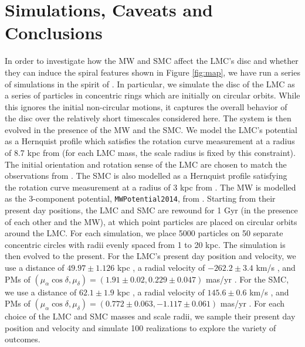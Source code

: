 \documentclass[a4paper,useAMS,usenatbib]{mnras}
\begin{document}
\section{Simulations, Caveats and Conclusions}

In order to investigate how the MW and SMC affect the LMC's disc and
whether they can induce the spiral features shown in Figure
\ref{fig:map}, we have run a series of simulations in the spirit of
\cite{Toomre1972}. In particular, we simulate the disc of the LMC as a
series of particles in concentric rings which are initially on
circular orbits. While this ignores the initial non-circular motions,
it captures the overall behavior of the disc over the relatively short
timescales considered here. The system is then evolved in the presence
of the MW and the SMC. We model the LMC's potential as a Hernquist
profile \citep{hernquist_profile} which satisfies the rotation curve
measurement at a radius of 8.7 kpc from \cite{vandermarel_lmc} (for
each LMC mass, the scale radius is fixed by this constraint). The
initial orientation and rotation sense of the LMC are chosen to match
the observations from \cite{vandermarel_lmc}. The SMC is also modelled
as a Hernquist profile satisfying the rotation curve measurement at a
radius of 3 kpc from \cite{staminirovic_smc_mass}. The MW is modelled
as the 3-component potential, \texttt{MWPotential2014}, from
\cite{galpy}. Starting from their present day positions, the LMC and
SMC are rewound for 1 Gyr (in the presence of each other and the MW),
at which point particles are placed on circular orbits around the
LMC. For each simulation, we place 5000 particles on 50 separate
concentric circles with radii evenly spaced from 1 to 20 kpc. The
simulation is then evolved to the present. For the LMC's present day
position and velocity, we use a distance of $49.97 \pm 1.126$ kpc
\citep{pietrzynski_lmc_dist}, a radial velocity of $-262.2\pm3.4$ km/s
\citep{vandermarel_lmc_rv}, and PMs of $(\mu_\alpha \cos \delta,
\mu_\delta) = (1.91\pm 0.02,0.229\pm0.047)$ mas/yr
\citep{kallivayalil_lmc_pm}. For the SMC, we use a distance of
$62.1\pm1.9$ kpc \citep{graczyk_smc_distance}, a radial velocity of
$145.6\pm0.6$ km/s \citep{harris_smc_vel}, and PMs of
$(\mu_\alpha \cos \delta, \mu_\delta) = (0.772\pm
0.063,-1.117\pm0.061)$ mas/yr \citep{kallivayalil_lmc_pm}. For each
choice of the LMC and SMC masses and scale radii, we sample their
present day position and velocity and simulate 100 realizations to
explore the variety of outcomes.
\end{document}
